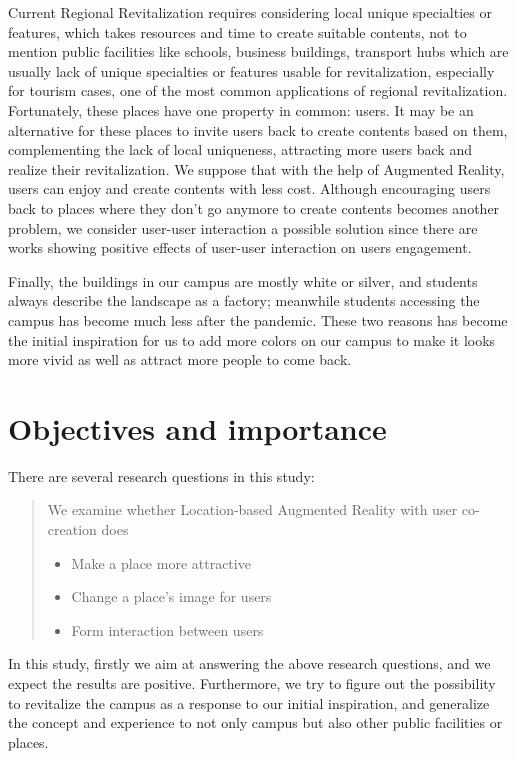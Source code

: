 Current Regional Revitalization requires considering local unique specialties or features, which takes resources and time to create suitable contents,
not to mention public facilities like schools, business buildings, transport hubs which are usually lack of unique specialties or features usable for revitalization,
especially for tourism cases, one of the most common applications of regional revitalization.
Fortunately, these places have one property in common: users. It may be an alternative for these places to invite users back to create contents based on them,
complementing the lack of local uniqueness, attracting more users back and realize their revitalization.
We suppose that with the help of Augmented Reality, users can enjoy and create contents with less cost.
Although encouraging users back to places where they don't go anymore to create contents becomes another problem,
we consider user-user interaction a possible solution since there are works showing positive effects of user-user interaction on users engagement.


Finally, the buildings in our campus are mostly white or silver, and students always describe the landscape as a factory; meanwhile students accessing the campus has become much less after the pandemic.
These two reasons has become the initial inspiration for us to add more colors on our campus to make it looks more vivid as well as attract more people to come back.

\section{Objectives and importance}


There are several research questions in this study:
\begin{quote}
We examine whether Location-based Augmented Reality with user co-creation does
  \begin{itemize}
    \item Make a place more attractive
    \item Change a place's image for users
    \item Form interaction between users
  \end{itemize}
\end{quote}


In this study, firstly we aim at answering the above research questions, and we expect the results are positive.
Furthermore, we try to figure out the possibility to revitalize the campus as a response to our initial inspiration,
and generalize the concept and experience to not only campus but also other public facilities or places.

